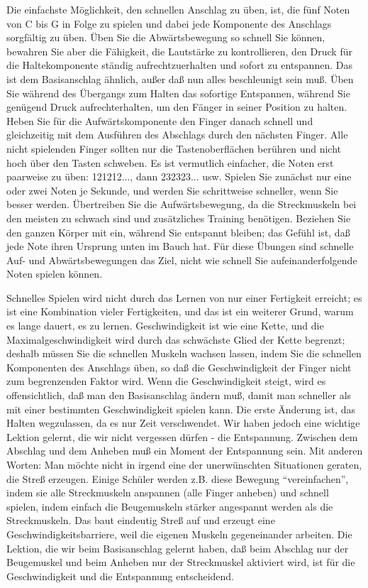 Die einfachste Möglichkeit, den schnellen Anschlag zu üben, ist, die fünf Noten von C bis G in Folge zu spielen und dabei jede Komponente des Anschlags sorgfältig zu üben.
Üben Sie die Abwärtsbewegung so schnell Sie können, bewahren Sie aber die Fähigkeit, die Lautstärke zu kontrollieren, den Druck für die Haltekomponente ständig aufrechtzuerhalten und sofort zu entspannen.
Das ist dem Basisanschlag ähnlich, außer daß nun alles beschleunigt sein muß.
Üben Sie während des Übergangs zum Halten das sofortige Entspannen, während Sie genügend Druck aufrechterhalten, um den Fänger in seiner Position zu halten.
Heben Sie für die Aufwärtskomponente den Finger danach schnell und gleichzeitig mit dem Ausführen des Abschlags durch den nächsten Finger.
Alle nicht spielenden Finger sollten nur die Tastenoberflächen berühren und nicht hoch über den Tasten schweben.
Es ist vermutlich einfacher, die Noten erst paarweise zu üben: 121212..., dann 232323... usw.
Spielen Sie zunächst nur eine oder zwei Noten je Sekunde, und werden Sie schrittweise schneller, wenn Sie besser werden.
Übertreiben Sie die Aufwärtsbewegung, da die Streckmuskeln bei den meisten zu schwach sind und zusätzliches Training benötigen.
Beziehen Sie den ganzen Körper mit ein, während Sie entspannt bleiben; das Gefühl ist, daß jede Note ihren Ursprung unten im Bauch hat.
Für diese Übungen sind schnelle Auf- und Abwärtsbewegungen das Ziel, nicht wie schnell Sie aufeinanderfolgende Noten spielen können.

Schnelles Spielen wird nicht durch das Lernen von nur einer Fertigkeit erreicht; es ist eine Kombination vieler Fertigkeiten, und das ist ein weiterer Grund, warum es lange dauert, es zu lernen.
Geschwindigkeit ist wie eine Kette, und die Maximalgeschwindigkeit wird durch das schwächste Glied der Kette begrenzt; deshalb müssen Sie die schnellen Muskeln wachsen lassen, indem Sie die schnellen Komponenten des Anschlags üben, so daß die Geschwindigkeit der Finger nicht zum begrenzenden Faktor wird.
Wenn die Geschwindigkeit steigt, wird es offensichtlich, daß man den Basisanschlag ändern muß, damit man schneller als mit einer bestimmten Geschwindigkeit spielen kann.
Die erste Änderung ist, das Halten wegzulassen, da es nur Zeit verschwendet.
Wir haben jedoch eine wichtige Lektion gelernt, die wir nicht vergessen dürfen - die Entspannung.
Zwischen dem Abschlag und dem Anheben muß ein Moment der Entspannung sein.
Mit anderen Worten: Man möchte nicht in irgend eine der unerwünschten Situationen geraten, die Streß erzeugen.
Einige Schüler werden z.B. diese Bewegung \enquote{vereinfachen}, indem sie alle Streckmuskeln anspannen (alle Finger anheben) und schnell spielen, indem einfach die Beugemuskeln stärker angespannt werden als die Streckmuskeln.
Das baut eindeutig Streß auf und erzeugt eine Geschwindigkeitsbarriere, weil die eigenen Muskeln gegeneinander arbeiten.
Die Lektion, die wir beim Basisanschlag gelernt haben, daß beim Abschlag nur der Beugemuskel und beim Anheben nur der Streckmuskel aktiviert wird, ist für die Geschwindigkeit und die Entspannung entscheidend.



